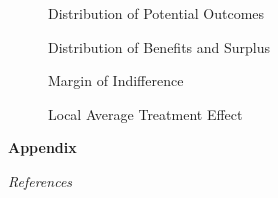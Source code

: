 \begin{frame}
\begin{figure}\caption{Distribution of Potential Outcomes}
\end{figure}
\end{frame}

\begin{frame}
\begin{figure}\caption{Distribution of Benefits and Surplus}
\end{figure}
\end{frame}

\begin{frame}
\begin{figure}\caption{Margin of Indifference}
\end{figure}
\end{frame}

\begin{frame}
\begin{figure}\caption{Local Average Treatment Effect}
\end{figure}
\end{frame}

\beginbackup\appendix
\begin{frame}\begin{center}
\LARGE\textbf{Appendix}
\end{center}\end{frame}

\begin{frame}\begin{center}
\LARGE\textit{References}
\end{center}\end{frame}
\begin{frame}[allowframebreaks]\frametitle{}

\nocite{Carneiro.2011, Heckman.1990c, Heckman.2010h}





\end{frame}

\backupend

